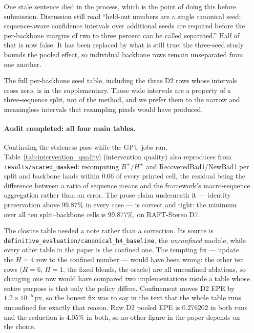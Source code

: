 \documentclass[11pt,a4paper]{article}
\begin{document}
One stale sentence died in the process, which is the point of doing this
before submission. Discussion still read ``held-out numbers are a single
canonical seed; sequence-aware confidence intervals over additional seeds
are required before the per-backbone margins of two to three percent can
be called separated.'' Half of that is now false. It has been replaced by
what is still true: the three-seed study bounds the pooled effect, so
individual backbone rows remain unseparated from one another.

The full per-backbone seed table, including the three D2 rows whose
intervals cross zero, is in the supplementary. Those wide intervals are a
property of a three-sequence split, not of the method, and we prefer them
to the narrow and meaningless intervals that resampling pixels would have
produced.



\paragraph{Audit completed: all four main tables.} Continuing the staleness
pass while the GPU jobs ran, Table~\ref{tab:intervention_quality}
(intervention quality) also reproduces from
\texttt{results/scared\_masked}: recomputing $B^+/H^+$ and
RecoveredBad1/NewBad1 per split and backbone lands within $0.06$ of every
printed cell, the residual being the difference between a ratio of
sequence means and the framework's macro-sequence aggregation rather than
an error. The prose claim underneath it --- identity preservation above
$99.87\%$ in every case --- is correct and tight: the minimum over all ten
split--backbone cells is $99.877\%$, on RAFT-Stereo D7.

The closure table needed a note rather than a correction. Its source is
\texttt{definitive\_evaluation/canonical\_h4\_baseline}, the
\emph{unconfined} module, while every other table in the paper is the
confined one. The tempting fix --- update the $H=4$ row to the confined
number --- would have been wrong: the other ten rows ($H=6$, $H=1$, the
fixed blends, the oracle) are all unconfined ablations, so changing one
row would have compared two implementations inside a table whose entire
purpose is that only the policy differs. Confinement moves D2 EPE by
$1.2\times10^{-5}$\,px, so the honest fix was to say in the text that the
whole table runs unconfined for exactly that reason. Raw D2 pooled EPE is
$0.276202$ in both runs and the reduction is $4.05\%$ in both, so no other
figure in the paper depends on the choice.
\end{document}
